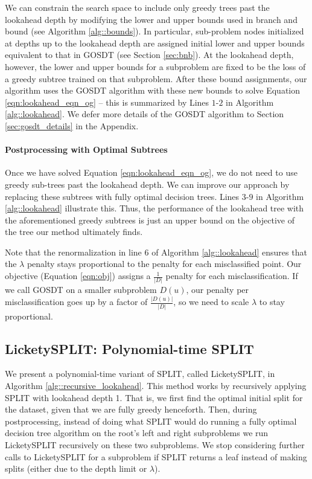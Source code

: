 We can constrain the search space to include only greedy trees past the lookahead depth by modifying the lower and upper bounds used in branch and bound (see Algorithm \ref{alg::bounds}). In particular, sub-problem nodes initialized at depths up to the lookahead depth are assigned initial lower and upper bounds equivalent to that in GOSDT \citep{gosdt} (see Section \ref{sec:bnb}). At the lookahead depth, however, the lower and upper bounds for a subproblem are fixed to be the loss of a greedy subtree trained on that subproblem. After these bound assignments, our algorithm uses the GOSDT algorithm with these new bounds to solve Equation \ref{eqn:lookahead_eqn_og} -- this is summarized by Lines $1$-$2$ in Algorithm \ref{alg::lookahead}. We defer more details of the GOSDT algorithm to Section \ref{sec:gosdt_details} in the Appendix.

\paragraph{Postprocessing with Optimal Subtrees}
Once we have solved Equation \ref{eqn:lookahead_eqn_og}, we do not need to use greedy sub-trees past the lookahead depth. We can improve our approach by replacing these subtrees with fully optimal decision trees. Lines $3$-$9$ in Algorithm \ref{alg::lookahead} illustrate this.
Thus, the performance of the lookahead tree with the aforementioned greedy subtrees is just an upper bound on the objective of the tree our method ultimately finds.

Note that the renormalization in line $6$ of Algorithm \ref{alg::lookahead} ensures that the $\lambda$ penalty stays proportional to the penalty for each misclassified point. 
Our objective (Equation \ref{eqn:obj}) assigns a $\frac{1}{|D|}$ penalty for each misclassification. If we call GOSDT on a smaller subproblem $D(u)$, our penalty per misclassification goes up by a factor of $\frac{|D(u)|}{|D|}$, so we need to scale $\lambda$ to stay proportional.

\subsection{LicketySPLIT: Polynomial-time SPLIT}\label{subsec:recursive}
We present a polynomial-time variant of SPLIT, called LicketySPLIT, in Algorithm \ref{alg::recursive_lookahead}. This method works by recursively applying SPLIT with lookahead depth 1. That is, we first find the optimal initial split for the dataset, given that we are fully greedy henceforth. Then, during postprocessing, instead of doing what SPLIT would do \textemdash running a fully optimal decision tree algorithm on the root's left and right subproblems \textemdash we run LicketySPLIT recursively on these two subproblems.
We stop considering further calls to LicketySPLIT for a subproblem if SPLIT returns a leaf instead of making splits (either due to the depth limit or $\lambda$).

